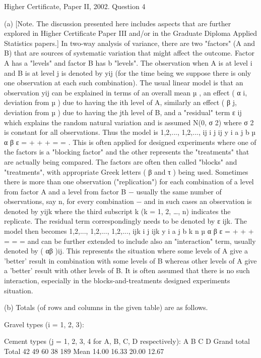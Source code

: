 Higher Certificate, Paper II, 2002.  Question 4 
 
 
(a) [Note.  The discussion presented here includes aspects that are further explored in Higher Certificate Paper III and/or in the Graduate Diploma Applied Statistics papers.] 
 In two-way analysis of variance, there are two "factors" (A and B) that are sources of systematic variation that might affect the outcome.  Factor A has a "levels" and factor B has b "levels".  The observation when A is at level i and B is at level j is denoted by yij (for the time being we suppose there is only one observation at each such combination).  The usual linear model is that an observation yij can be explained in terms of an overall mean µ , an effect ( α i, deviation from µ ) due to having the ith level of A, similarly an effect ( β j, deviation from µ ) due to having the jth level of B, and a "residual" term ε ij which explains the random natural variation and is assumed N(0, σ 2) where σ 2 is constant for all observations.  Thus the model is 
  1,2,..., 1,2,..., ij i j ij y i a j b µ α β ε = + + + = = . This is often applied for designed experiments where one of the factors is a "blocking factor" and the other represents the "treatments" that are actually being compared.  The factors are often then called "blocks" and "treatments", with appropriate Greek letters ( β and τ ) being used. 
 Sometimes there is more than one observation ("replication") for each combination of a level from factor A and a level from factor B  −  usually the same number of observations, say n, for every combination  −  and in such cases an observation is denoted by yijk where the third subscript k (k = 1, 2, …, n) indicates the replicate.  The residual term correspondingly needs to be denoted by ε ijk.  The model then becomes 
  1,2,..., 1,2,..., 1,2,..., ijk i j ijk y i a j b k n µ α β ε = + + + = = = and can be further extended to include also an "interaction" term, usually denoted by ( αβ )ij.  This represents the situation where some levels of A give a 'better' result in combination with some levels of B whereas other levels of A give a 'better' result with other levels of B.  It is often assumed that there is no such interaction, especially in the blocks-and-treatments designed experiments situation. 
 
 
(b) Totals (of rows and columns in the given table) are as follows. 
 
Gravel types (i = 1, 2, 3): 
 
 
 
Cement types (j = 1, 2, 3, 4 for A, B, C, D respectively): 
  A B C D Grand total Total 42 49 60 38 189 Mean 14.00 16.33 20.00 12.67  
 

